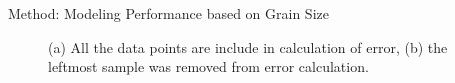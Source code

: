 \documentclass[10pt]{beamer}
\begin{document}
\begin{frame}{Method: Modeling Performance based on Grain Size}
	\begin{outline}
		\begin{figure}[H]
			\centering
			\caption{(a) All the data points are include in calculation of error, (b) the leftmost sample was removed from error calculation.}	
			\label{fig37}
		\end{figure}
	\end{outline}
\end{frame}
\end{document}
